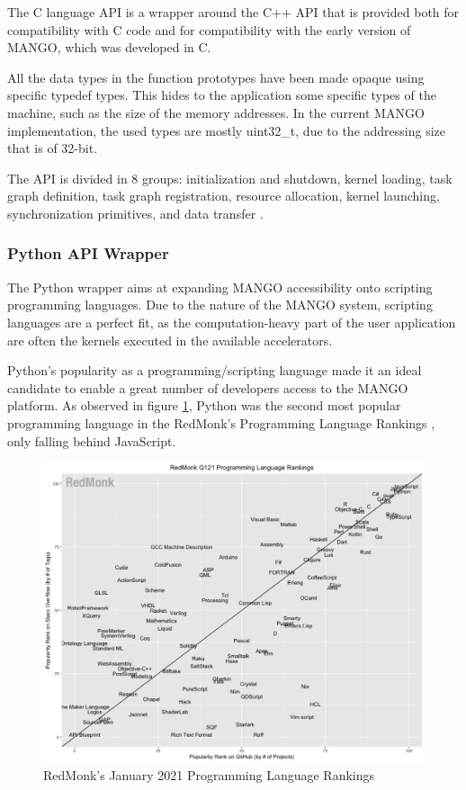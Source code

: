 The C language API is a wrapper around the C++ API that is provided both for compatibility with C code and for compatibility with the early version of MANGO, which was developed in C.

All the data types in the function prototypes have been made opaque using specific typedef types. This hides to the application some specific types of the machine, such as the size of the memory addresses. In the current MANGO implementation, the used types are mostly uint32\_t, due to the addressing size that is of 32-bit.

The API is divided in 8 groups: initialization and shutdown, kernel loading, task graph definition, task graph registration, resource allocation, kernel launching, synchronization primitives, and data transfer \cite{mango_exploring_manycore_architectures}.

\subsubsection{Python API Wrapper} \label{python_wrapper}

The Python wrapper aims at expanding MANGO accessibility onto scripting programming languages. Due to the nature of the MANGO system, scripting languages are a perfect fit, as the computation-heavy part of the user application are often the kernels executed in the available accelerators.

Python's popularity as a programming/scripting language made it an ideal candidate to enable a great number of developers access to the MANGO platform. As observed in figure \ref{fig:redmonk-ranks}, Python was the second most popular programming language in the RedMonk's Programming Language Rankings \cite{redmonks_rankings}, only falling behind JavaScript.

\begin{figure}[H]
    \centering
    \includegraphics[width=\textwidth]{img/redmonk-ranks.png}
    \captionsetup{justification=centering}
    \caption{RedMonk's January 2021 Programming Language Rankings}
    \label{fig:redmonk-ranks}
\end{figure}

